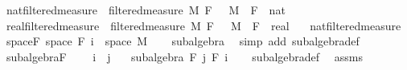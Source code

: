 \begin{isabellebody}
\endisatagproof
{\isafoldproof}%
%
\isadelimproof
%
\endisadelimproof
%
\isadelimdocument
%
\endisadelimdocument
%
\isatagdocument
%
\isamarkuptrue%
%
\endisatagdocument
{\isafolddocument}%
%
\isadelimdocument
%
\endisadelimdocument
{}\isamarkupfalse%
\ nat{\isacharunderscore}{\kern0pt}filtered{\isacharunderscore}{\kern0pt}measure\ {\isacharequal}{\kern0pt}\ filtered{\isacharunderscore}{\kern0pt}measure\ M\ F\ {}\ \ M\ \ F\ {\isacharcolon}{\kern0pt}{\isacharcolon}{\kern0pt}\ {\isachardoublequoteopen}nat\ {\isasymRightarrow}\ {\isacharunderscore}{\kern0pt}{\isachardoublequoteclose}\isanewline
{}\isamarkupfalse%
\ real{\isacharunderscore}{\kern0pt}filtered{\isacharunderscore}{\kern0pt}measure\ {\isacharequal}{\kern0pt}\ filtered{\isacharunderscore}{\kern0pt}measure\ M\ F\ {}\ \ M\ \ F\ {\isacharcolon}{\kern0pt}{\isacharcolon}{\kern0pt}\ {\isachardoublequoteopen}real\ {\isasymRightarrow}\ {\isacharunderscore}{\kern0pt}{\isachardoublequoteclose}\isanewline
\isanewline
{}\isamarkupfalse%
\ nat{\isacharunderscore}{\kern0pt}filtered{\isacharunderscore}{\kern0pt}measure\isanewline
{}\isanewline
\isanewline
{}\isamarkupfalse%
\ space{\isacharunderscore}{\kern0pt}F{\isacharcolon}{\kern0pt}\ {\isachardoublequoteopen}space\ {\isacharparenleft}{\kern0pt}F\ i{\isacharparenright}{\kern0pt}\ {\isacharequal}{\kern0pt}\ space\ M{\isachardoublequoteclose}\isanewline
%
\isadelimproof
\ \ %
\endisadelimproof
%
\isatagproof
{}\isamarkupfalse%
\ subalgebra\ \isamarkupfalse%
\ {\isacharparenleft}{\kern0pt}simp\ add{\isacharcolon}{\kern0pt}\ subalgebra{\isacharunderscore}{\kern0pt}def{\isacharparenright}{\kern0pt}%
\endisatagproof
{\isafoldproof}%
%
\isadelimproof
\isanewline
%
\endisadelimproof
\isanewline
{}\isamarkupfalse%
\ subalgebra{\isacharunderscore}{\kern0pt}F{\isacharcolon}{\kern0pt}\ \isanewline
\ \ \ {\isachardoublequoteopen}i\ {\isasymle}\ j{\isachardoublequoteclose}\isanewline
\ \ \ {\isachardoublequoteopen}subalgebra\ {\isacharparenleft}{\kern0pt}F\ j{\isacharparenright}{\kern0pt}\ {\isacharparenleft}{\kern0pt}F\ i{\isacharparenright}{\kern0pt}{\isachardoublequoteclose}\isanewline
%
\isadelimproof
\ \ %
\endisadelimproof
%
\isatagproof
{}\isamarkupfalse%
\ subalgebra{\isacharunderscore}{\kern0pt}def\ \isamarkupfalse%
\ assms\ \isamarkupfalse%

\end{isabellebody}
